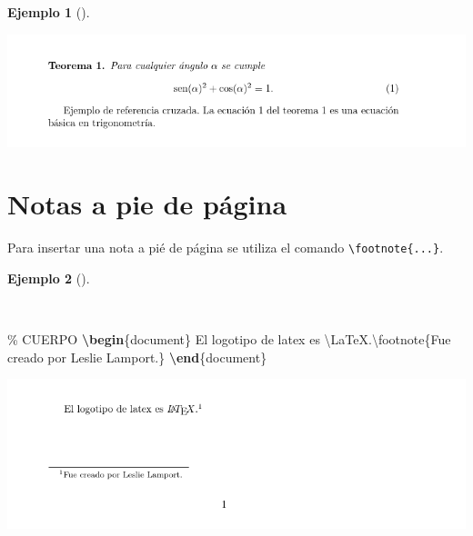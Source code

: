 \documentclass[
  a4paper,
]{scrreport}
\newenvironment{Shaded}{\begin{snugshade}}{\end{snugshade}}
\newcommand{\CommentTok}[1]{\textcolor[rgb]{0.37,0.37,0.37}{#1}}
\newcommand{\ExtensionTok}[1]{\textcolor[rgb]{0.00,0.23,0.31}{#1}}
\newcommand{\FunctionTok}[1]{\textcolor[rgb]{0.28,0.35,0.67}{#1}}
\newcommand{\KeywordTok}[1]{\textcolor[rgb]{0.00,0.23,0.31}{\textbf{#1}}}
\newcommand{\NormalTok}[1]{\textcolor[rgb]{0.00,0.23,0.31}{#1}}
\theoremstyle{definition}
\newtheorem{example}{Ejemplo}[chapter]
\theoremstyle{remark}
\begin{document}
\begin{example}[]
\begin{tcolorbox}
\includegraphics{img/referencias-cruzadas/referencias-cruzadas.png}

\end{tcolorbox}

\end{example}

\section{Notas a pie de página}\label{notas-a-pie-de-puxe1gina}

Para insertar una nota a pié de página se utiliza el comando
\texttt{\textbackslash{}footnote\{...\}}.

\begin{example}[]\protect\hypertarget{exm-notas-pie}{}\label{exm-notas-pie}

~

\begin{Shaded}
\begin{Highlighting}[]
\CommentTok{\% CUERPO}
\KeywordTok{\textbackslash{}begin}\NormalTok{\{}\ExtensionTok{document}\NormalTok{\}}
\NormalTok{El logotipo de latex es }\FunctionTok{\textbackslash{}LaTeX}\NormalTok{.}\FunctionTok{\textbackslash{}footnote}\NormalTok{\{Fue creado por Leslie Lamport.\}}
\KeywordTok{\textbackslash{}end}\NormalTok{\{}\ExtensionTok{document}\NormalTok{\}}
\end{Highlighting}
\end{Shaded}

\begin{tcolorbox}[enhanced jigsaw, colframe=quarto-callout-note-color-frame, opacityback=0, title={Salida}, bottomrule=.15mm, left=2mm, coltitle=black, arc=.35mm, leftrule=.75mm, colback=white, rightrule=.15mm, colbacktitle=quarto-callout-note-color!10!white, toprule=.15mm, breakable, opacitybacktitle=0.6, bottomtitle=1mm, toptitle=1mm, titlerule=0mm]

\includegraphics{img/referencias-cruzadas/nota-pie.png}

\end{tcolorbox}

\end{example}
\end{document}
